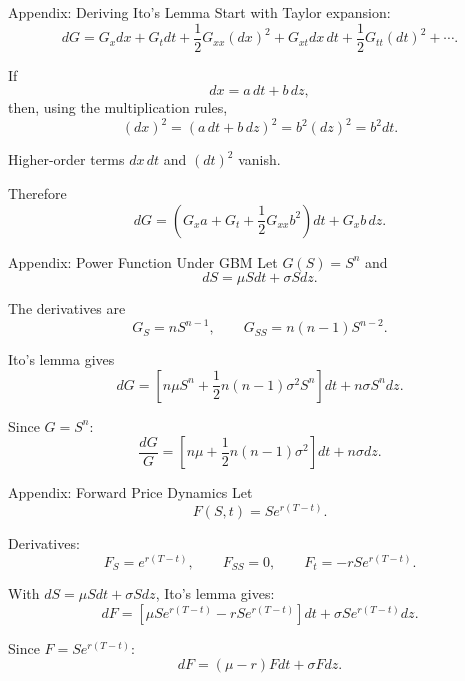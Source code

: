 \documentclass[aspectratio=169,11pt]{beamer}
\newcommand{\Ito}{Ito}
\begin{document}
\begin{frame}[label=deriv_ito]{Appendix: Deriving Ito's Lemma}
    Start with Taylor expansion:
    \[
        dG
        =
        G_xdx+G_tdt
        +\frac{1}{2}G_{xx}(dx)^2
        +G_{xt}dx\,dt
        +\frac{1}{2}G_{tt}(dt)^2+\cdots.
    \]

    If
    \[
        dx=a\,dt+b\,dz,
    \]
    then, using the multiplication rules,
    \[
        (dx)^2
        =
        (a\,dt+b\,dz)^2
        =
        b^2(dz)^2
        =
        b^2dt.
    \]

    Higher-order terms \(dx\,dt\) and \((dt)^2\) vanish.

    Therefore
    \[
        dG
        =
        \left(G_xa+G_t+\frac{1}{2}G_{xx}b^2\right)dt
        +
        G_xb\,dz.
    \]

    \hyperlink{ito_statement}{}
\end{frame}

\begin{frame}[label=deriv_power]{Appendix: Power Function Under GBM}
    Let \(G(S)=S^n\) and
    \[
        dS=\mu Sdt+\sigma Sdz.
    \]

    The derivatives are
    \[
        G_S=nS^{n-1},
        \qquad
        G_{SS}=n(n-1)S^{n-2}.
    \]

    \Ito's lemma gives
    \[
        dG
        =
        \left[
            n\mu S^n+\frac{1}{2}n(n-1)\sigma^2S^n
        \right]dt
        +
        n\sigma S^n dz.
    \]

    Since \(G=S^n\):
    \[
        \frac{dG}{G}
        =
        \left[n\mu+\frac{1}{2}n(n-1)\sigma^2\right]dt
        +
        n\sigma dz.
    \]

    \hyperlink{ito_examples_main}{}
\end{frame}

\begin{frame}[label=deriv_forward]{Appendix: Forward Price Dynamics}
    Let
    \[
        F(S,t)=S e^{r(T-t)}.
    \]

    Derivatives:
    \[
        F_S=e^{r(T-t)},
        \qquad
        F_{SS}=0,
        \qquad
        F_t=-rS e^{r(T-t)}.
    \]

    With \(dS=\mu Sdt+\sigma Sdz\), \Ito's lemma gives:
    \[
        dF
        =
        \left[
            \mu S e^{r(T-t)}-rS e^{r(T-t)}
        \right]dt
        +
        \sigma S e^{r(T-t)}dz.
    \]

    Since \(F=S e^{r(T-t)}\):
    \[
        dF=(\mu-r)Fdt+\sigma Fdz.
    \]

    \hyperlink{forward_main}{}
\end{frame}
\end{document}
